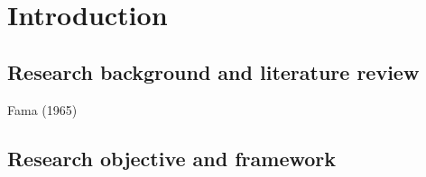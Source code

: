 \section{Introduction}
\subsection{Research background and literature review}
Fama (1965)\cite{fama1965}

\subsection{Research objective and framework}
